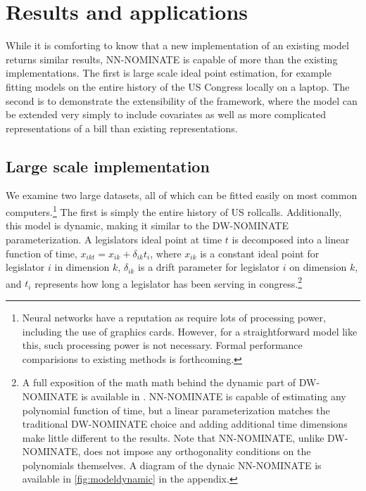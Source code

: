 \documentclass[11pt,]{article}
\begin{document}
\section{Results and applications}\label{results-and-applications}

While it is comforting to know that a new implementation of an existing
model returns similar results, NN-NOMINATE is capable of more than the
existing implementations. The first is large scale ideal point
estimation, for example fitting models on the entire history of the US
Congress locally on a laptop. The second is to demonstrate the
extensibility of the framework, where the model can be extended very
simply to include covariates as well as more complicated representations
of a bill than existing representations.

\subsection{Large scale
implementation}\label{large-scale-implementation}

We examine two large datasets, all of which can be fitted easily on most
common computers.\footnote{Neural networks have a reputation as require
  lots of processing power, including the use of graphics cards.
  However, for a straightforward model like this, such processing power
  is not necessary. Formal performance comparisions to existing methods
  is forthcoming. } The first is simply the entire history of US
rollcalls. Additionally, this model is dynamic, making it similar to the
DW-NOMINATE parameterization. A legislators ideal point at time \(t\) is
decomposed into a linear function of time,
\(x_{ikt} = x_{ik} + \delta_{ik} t_i\), where \(x_{ik}\) is a constant
ideal point for legislator \(i\) in dimension \(k\), \(\delta_{ik}\) is
a drift parameter for legislator \(i\) on dimension \(k\), and \(t_i\)
represents how long a legislator has been serving in congress.\footnote{A
  full exposition of the math math behind the dynamic part of
  DW-NOMINATE is available in \cite{carroll2009measuring}. NN-NOMINATE
  is capable of estimating any polynomial function of time, but a linear
  parameterization matches the traditional DW-NOMINATE choice and adding
  additional time dimensions make little different to the results. Note
  that NN-NOMINATE, unlike DW-NOMINATE, does not impose any
  orthogonality conditions on the polynomials themselves. A diagram of
  the dynaic NN-NOMINATE is available in \ref{fig:modeldynamic} in the
  appendix.}
\end{document}

